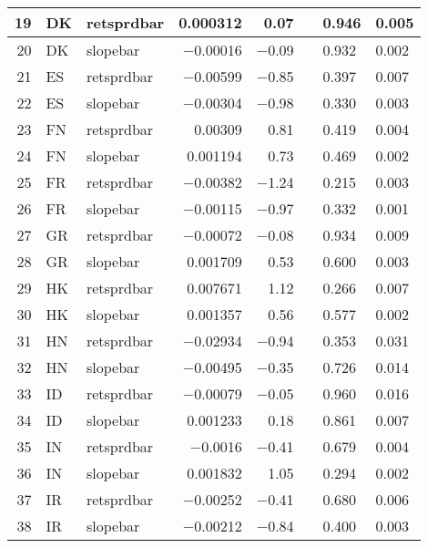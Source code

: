 \begin{longtable}{|r|l|l|r|r|l|l|l|}
   19 &    DK &    retsprdbar &    0.000312 &    0.07 &      &    0.946 &    0.005\\\hline
   20 &    DK &    slopebar &    $-$0.00016 &    $-$0.09 &      &    0.932 &    0.002\\\hline
   21 &    ES &    retsprdbar &    $-$0.00599 &    $-$0.85 &      &    0.397 &    0.007\\\hline
   22 &    ES &    slopebar &    $-$0.00304 &    $-$0.98 &      &    0.330 &    0.003\\\hline
   23 &    FN &    retsprdbar &    0.00309 &    0.81 &      &    0.419 &    0.004\\\hline
   24 &    FN &    slopebar &    0.001194 &    0.73 &      &    0.469 &    0.002\\\hline
   25 &    FR &    retsprdbar &    $-$0.00382 &    $-$1.24 &      &    0.215 &    0.003\\\hline
   26 &    FR &    slopebar &    $-$0.00115 &    $-$0.97 &      &    0.332 &    0.001\\\hline
   27 &    GR &    retsprdbar &    $-$0.00072 &    $-$0.08 &      &    0.934 &    0.009\\\hline
   28 &    GR &    slopebar &    0.001709 &    0.53 &      &    0.600 &    0.003\\\hline
   29 &    HK &    retsprdbar &    0.007671 &    1.12 &      &    0.266 &    0.007\\\hline
   30 &    HK &    slopebar &    0.001357 &    0.56 &      &    0.577 &    0.002\\\hline
   31 &    HN &    retsprdbar &    $-$0.02934 &    $-$0.94 &      &    0.353 &    0.031\\\hline
   32 &    HN &    slopebar &    $-$0.00495 &    $-$0.35 &      &    0.726 &    0.014\\\hline
   33 &    ID &    retsprdbar &    $-$0.00079 &    $-$0.05 &      &    0.960 &    0.016\\\hline
   34 &    ID &    slopebar &    0.001233 &    0.18 &      &    0.861 &    0.007\\\hline
   35 &    IN &    retsprdbar &    $-$0.0016 &    $-$0.41 &      &    0.679 &    0.004\\\hline
   36 &    IN &    slopebar &    0.001832 &    1.05 &      &    0.294 &    0.002\\\hline
   37 &    IR &    retsprdbar &    $-$0.00252 &    $-$0.41 &      &    0.680 &    0.006\\\hline
   38 &    IR &    slopebar &    $-$0.00212 &    $-$0.84 &      &    0.400 &    0.003\\\hline

\end{longtable}
